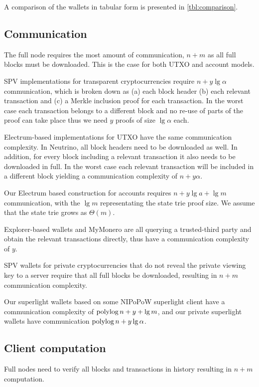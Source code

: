 A comparison of the wallets in tabular form is presented in \cref{tbl:comparison}.

\subsection{Communication}
The full node requires the most amount of communication, $n+m$ as all full blocks must be downloaded. This is the case for both UTXO and account models.

SPV implementations for transparent cryptocurrencies require $n+y\lg{\alpha}$ communication, which is broken down as (a) each block header (b) each relevant transaction and (c) a Merkle inclusion proof for each transaction. In the worst case each transaction belongs to a different block and no re-use of parts of the proof can take place thus we need $y$ proofs of size $\lg{\alpha}$ each.

Electrum-based implementations for UTXO have the same communication complexity. In Neutrino, all block headers need to be downloaded as well. In addition, for every block including a relevant transaction it also needs to be downloaded in full. In the worst case each relevant transaction will be included in a different block yielding a communication complexity of $n+y\alpha$.

Our Electrum based construction for accounts requires $n+y\lg{a}+\lg{m}$ communication, with the $\lg{m}$ representating the state trie proof size. We assume that the state trie grows as $\Theta(m)$.

Explorer-based wallets and MyMonero are all querying a trusted-third party and obtain the relevant transactions directly, thus have a communication complexity of $y$.

SPV wallets for private cryptocurrencies that do not reveal the private viewing key to a server require that all full blocks be downloaded, resulting in $n+m$ communication complexity.

Our superlight wallets based on some NIPoPoW superlight client have a communication complexity of $\operatorname{polylog}{n} + y + \lg{m}$, and our private superlight wallets have communication $\operatorname{polylog}{n} +y\lg{\alpha}$.

\subsection{Client computation}
Full nodes need to verify all blocks and transactions in history resulting in $n+m$ computation.

